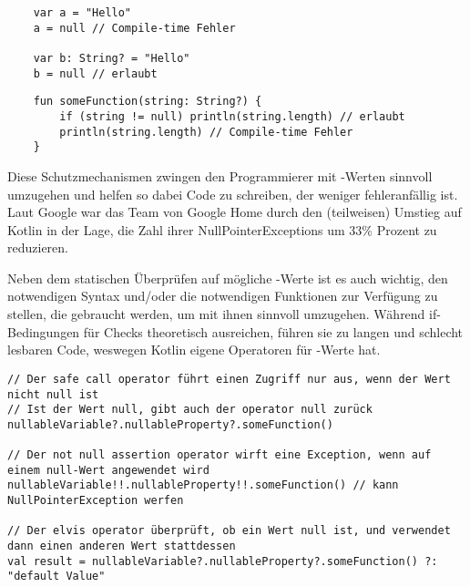 \begin{verbatim}
    var a = "Hello"
    a = null // Compile-time Fehler

    var b: String? = "Hello"
    b = null // erlaubt
\end{verbatim}

\begin{verbatim}
    fun someFunction(string: String?) {
        if (string != null) println(string.length) // erlaubt
        println(string.length) // Compile-time Fehler
    }
\end{verbatim}

Diese Schutzmechanismen zwingen den Programmierer mit -Werten sinnvoll umzugehen und helfen so dabei
Code zu schreiben, der weniger fehleranfällig ist.
Laut Google war das Team von Google Home durch den (teilweisen) Umstieg auf Kotlin in der Lage, die Zahl ihrer
NullPointerExceptions um 33\% Prozent zu reduzieren.\cite{androidDevGoogleHome}

Neben dem statischen Überprüfen auf mögliche -Werte ist es auch wichtig, den notwendigen
Syntax und/oder die notwendigen Funktionen zur Verfügung zu stellen, die gebraucht werden, um mit ihnen sinnvoll
umzugehen.
Während if-Bedingungen für  Checks theoretisch ausreichen, führen sie zu langen und schlecht lesbaren
Code, weswegen Kotlin eigene Operatoren für -Werte hat.\cite{kdocNullSafety}

\begin{verbatim}
// Der safe call operator führt einen Zugriff nur aus, wenn der Wert nicht null ist
// Ist der Wert null, gibt auch der operator null zurück
nullableVariable?.nullableProperty?.someFunction()

// Der not null assertion operator wirft eine Exception, wenn auf einem null-Wert angewendet wird
nullableVariable!!.nullableProperty!!.someFunction() // kann NullPointerException werfen

// Der elvis operator überprüft, ob ein Wert null ist, und verwendet dann einen anderen Wert stattdessen
val result = nullableVariable?.nullableProperty?.someFunction() ?: "default Value"
\end{verbatim}

